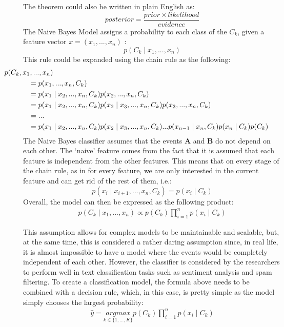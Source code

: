     The theorem could also be written in plain English as:
    $$ posterior = \frac{prior \times likelihood}{evidence} $$
    The Naive Bayes Model assigns a probability to each class of the $C_k$, given a feature vector $ x= (x_1, ..., x_n)$ :
    $$p(C_k \mid x_1, ..., x_n)$$
    This rule could be expanded using the chain rule as the following:
    \begin{align}
        \mathclap{p (C_k, x_1, ..., x_n)}  & \notag \\
    &= p(x_1, ..., x_n, C_k)  & \notag \\
    &= p(x_1 \mid x_2, ..., x_n, C_k)p(x_2, ..., x_n, C_k)  & \notag \\
    &= p(x_1 \mid x_2, ..., x_n, C_k)p(x_2 \mid x_3, ..., x_n, C_k)p(x_3, ..., x_n, C_k)  & \notag \\
    &= ...  & \notag \\
    &= p(x_1 \mid x_2, ..., x_n, C_k)p(x_2 \mid x_3, ..., x_n, C_k)...p(x_{n-1} \mid x_n, C_k)p(x_n \mid
    C_k)p(C_k)  & \notag \\
    \end{align}
    The Naive Bayes classifier assumes that the events \textbf{A} and \textbf{B} do not depend on each other.
    The `naive' feature comes from the fact that it is assumed that each feature is independent from the other features. This means that on every stage of the chain rule, as in for every feature, we are only interested in the current feature and can get rid of the rest of them, i.e.:
    $$ p(x_i \mid x_{i+1}, ..., x_n, C_k) = p(x_i \mid C_k) $$
    Overall, the model can then be expressed as the following product:
    \begin{align}
        p(C_k \mid x_1, ..., x_n) \propto p(C_k) \prod_{i=1}^{n} p(x_i \mid C_k)
    \end{align}
   
     This assumption allows for complex models to be maintainable and scalable, but, at the same time, this is considered a rather daring assumption since, in real life, it is almost impossible to have a model where the events would be completely independent of each other. However, the classifier is considered by the researchers to perform well in text classification tasks such as sentiment analysis and spam filtering.
     To create a classification model, the formula above needs to be combined with a decision rule, which, in this case, is pretty simple as the model simply chooses the largest probability:
     \begin{align}
         \hat{y} = \underset{k \in \{1,...,K\}} {argmax} p(C_k) \prod_{i=1}^{n} p(x_i \mid C_k)
     \end{align}
     
